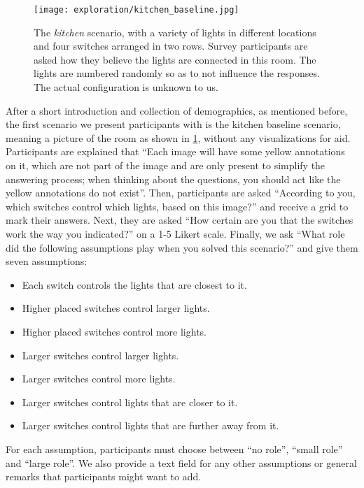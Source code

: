 \begin{figure}
    \centering
    \texttt{[image: exploration/kitchen\_baseline.jpg]}
    \caption{The \textit{kitchen} scenario, with a variety of lights in different locations and four switches arranged in two rows. Survey participants are asked how they believe the lights are connected in this room. The lights are numbered randomly so as to not influence the responses. The actual configuration is unknown to us.}
    \label{fig:explor:kitchen_baseline}
\end{figure}

After a short introduction and collection of demographics, as mentioned before, the first scenario we present participants with is the kitchen baseline scenario, meaning a picture of the room as shown in \ref{fig:explor:kitchen_baseline}, without any visualizations for aid. Participants are explained that ``Each image will have some yellow annotations on it, which are not part of the image and are only present to simplify the answering process; when thinking about the questions, you should act like the yellow annotations do not exist''. Then, participants are asked ``According to you, which switches control which lights, based on this image?'' and receive a grid to mark their answers. Next, they are asked ``How certain are you that the switches work the way you indicated?'' on a 1-5 Likert scale. Finally, we ask ``What role did the following assumptions play when you solved this scenario?'' and give them seven assumptions:
\begin{itemize}
    \item Each switch controls the lights that are closest to it.
    \item Higher placed switches control larger lights.
    \item Higher placed switches control more lights.
    \item Larger switches control larger lights.
    \item Larger switches control more lights.
    \item Larger switches control lights that are closer to it.
    \item Larger switches control lights that are further away from it.
\end{itemize}
For each assumption, participants must choose between ``no role'', ``small role'' and ``large role''. We also provide a text field for any other assumptions or general remarks that participants might want to add.

